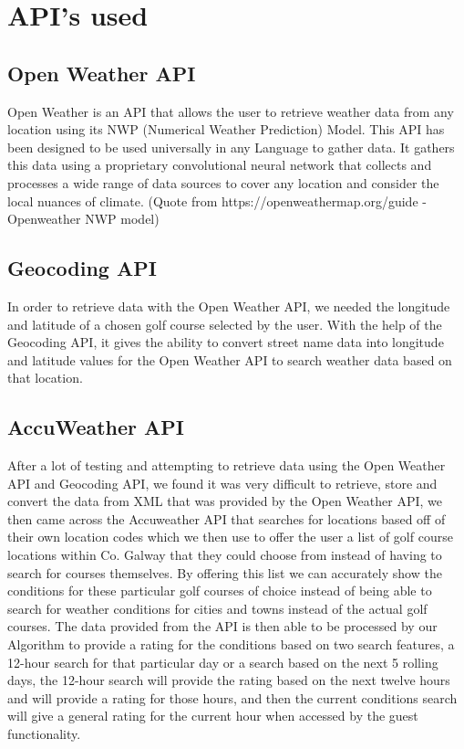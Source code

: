 \section{API's used}

\subsection{Open Weather API}
Open Weather is an API that allows the user to retrieve weather data from any location using its NWP (Numerical Weather Prediction) Model. This API has been designed to be used universally in any Language to gather data. It gathers this data using a proprietary convolutional neural network that collects and processes a wide range of data sources to cover any location and
consider the local nuances of climate.
(Quote from https://openweathermap.org/guide - Openweather NWP model)

\subsection{Geocoding API}
In order to retrieve data with the Open Weather API, we needed the longitude and latitude of a chosen golf course selected by the user. With the help of the Geocoding API, it gives the ability to convert street name data into longitude and latitude values for the Open Weather API to search weather data based on that location.

\subsection{AccuWeather API}
After a lot of testing and attempting to retrieve data using the Open Weather API and Geocoding API, we found it was very difficult to retrieve, store and convert the data from XML that was provided by the Open Weather API, we then came across the Accuweather API that searches for locations based off of their own location codes which we then use to offer the user a list of golf course locations within Co. Galway that they could choose from instead of having to search for courses themselves.
\newline
\newline
By offering this list we can accurately show the conditions for these particular golf courses of choice instead of being able to search for weather conditions for cities and towns instead of the actual golf courses.
\newline
\newline
The data provided from the API is then able to be processed by our Algorithm to provide a rating for the conditions based on two search features, a 12-hour search for that particular day or a search based on the next 5 rolling days, the 12-hour search will provide the rating based on the next twelve hours and will provide a rating for those hours, and then the current conditions search will give a general rating for the current hour when accessed by the guest functionality.

